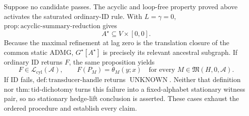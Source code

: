 Suppose no candidate passes.  The acyclic and loop-free property proved above activates the saturated ordinary-ID rule.  With \(L=\gamma=0\), \(\mathrm{prop:acyclic\text{-}summary\text{-}reduction}\) gives
\[
A^\star\subseteq V\times[0,0].
\]
Because the maximal refinement at lag zero is the translation closure of the common static ADMG, \(G^\star[A^\star]\) is precisely its relevant ancestral subgraph.  If ordinary ID returns \(F\), the same proposition yields
\[
F\in\mathcal L_{\mathrm{cyl}}(\mathcal A),
\qquad
F(P_M)=\theta_M(y;x)
\quad
\text{for every }M\in\mathfrak M(H,0,\mathcal A).
\]
If ID fails, \(\mathrm{def:transducer\text{-}handle}\) returns \(\operatorname{UNKNOWN}\).  Neither that definition nor \(\mathrm{thm:tid\text{-}dichotomy}\) turns this failure into a fixed-alphabet stationary witness pair, so no stationary hedge-lift conclusion is asserted.  These cases exhaust the ordered procedure and establish every claim.
